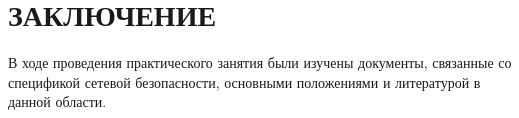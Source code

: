 \section*{ЗАКЛЮЧЕНИЕ}

В ходе проведения практического занятия были изучены документы, связанные
со спецификой сетевой безопасности, основными положениями и литературой
в данной области.

\newpage
